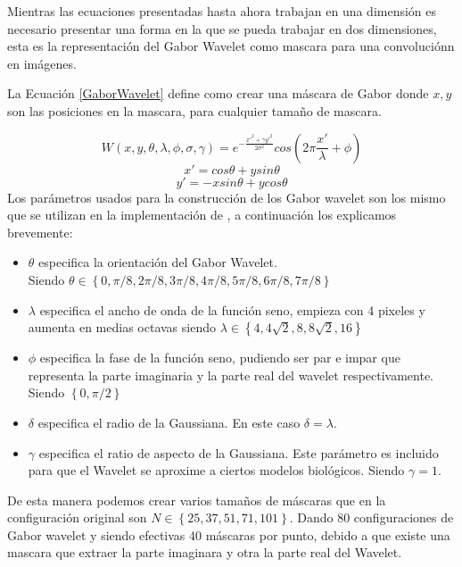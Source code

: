 Mientras las ecuaciones presentadas hasta ahora trabajan en una dimensión es necesario presentar una forma en la que se pueda trabajar en dos dimensiones, esta es la representación del Gabor Wavelet como mascara para una convoluciónn en imágenes.

La Ecuación \ref{GaborWavelet} define como crear una máscara de Gabor donde $x, y$ son las posiciones en la mascara, para cualquier tamaño de mascara.

\begin{equation}
W(x,y,\theta,\lambda, \phi, \sigma, \gamma )=e^{-\frac{x'^2+\gamma y'^2}{2 \sigma^2}}cos(2\pi \frac{x'}{\lambda}+\phi) 
\label{GaborWavelet}
\end{equation}
\begin{equation*}
x'=cos\theta+ysin\theta   
\label{GaborWaveletx}
\end{equation*}
\begin{equation*}
y'=-x sin\theta+ycos\theta
\label{GaborWavelety}
\end{equation*}
Los parámetros usados para la construcción de los Gabor wavelet son los mismo que se utilizan en la implementación de \cite{bolme2003elastic}, a continuación los explicamos brevemente:
\begin{itemize}
\item $\theta$ especifica la orientación del Gabor Wavelet.\\
Siendo $\theta \in \left\{0,\pi/8,2\pi/8,3\pi/8,4\pi/8,5\pi/8,6\pi/8,7\pi/8 \right\}$
\item $\lambda$ especifica el ancho de onda de la función seno, empieza con 4 pixeles y aumenta en medias octavas siendo $\lambda \in \left\{4,4\sqrt{2},8,8\sqrt{2},16\right\} $
\item $\phi$ especifica la fase de la función seno, pudiendo ser par e impar que representa la parte imaginaria y la parte real del wavelet respectivamente.
Siendo $\left\{0,\pi/2\right\}$
\item $\delta$ especifica el radio de la Gaussiana. En este caso $\delta=\lambda$.
\item $\gamma$ especifica el ratio de aspecto de la Gaussiana. Este parámetro es incluido para que el Wavelet se aproxime a ciertos modelos biológicos. Siendo $\gamma=1$.
\end{itemize}


De esta manera podemos crear varios tamaños de máscaras que en la configuración original son $N \in \left\{25, 37, 51, 71, 101 \right\}$. Dando 80 configuraciones de Gabor wavelet y siendo efectivas 40 máscaras por punto, debido a que existe una mascara que extraer la parte imaginara y otra la parte real del Wavelet.

